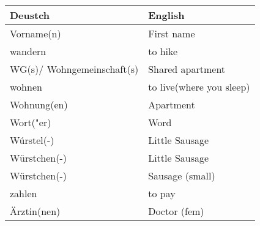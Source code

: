 \documentclass{article}
\renewcommand{\arraystretch}{1}
\begin{document}
\newpage

\begin{minipage}{0.48\textwidth}
    \centering
    \renewcommand{\arraystretch}{1.5}
    \begin{tabular}{|>{\raggedright\arraybackslash}p{3.5cm}|>{\raggedright\arraybackslash}p{3.5cm}|}
        \hline
        \rowcolor{gray!20} \textbf{Deustch} & \textbf{English} \\
        \hline
        Vorname(n) & First name \\\hline
        wandern & to hike \\\hline
        WG(s)/ Wohngemeinschaft(s) & Shared apartment \\\hline
        wohnen & to live(where you sleep) \\\hline
        Wohnung(en) & Apartment \\\hline
        Wort("er) & Word \\\hline
        Wúrstel(-) & Little Sausage \\\hline
        Würstchen(-) & Little Sausage \\\hline
        Würstchen(-) & Sausage (small) \\\hline
        zahlen & to pay \\\hline
        Ärztin(nen) & Doctor (fem) \\\hline
    \end{tabular}
\end{minipage}%
\end{document}
